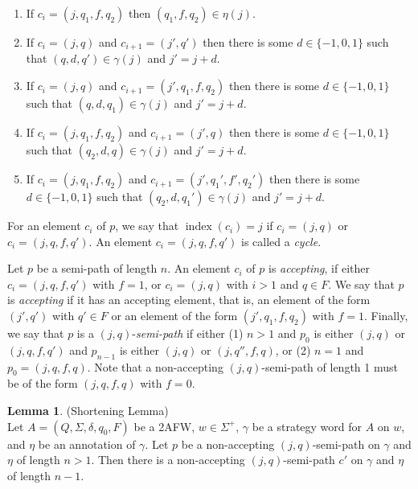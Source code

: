 \documentclass[10pt,a4paper]{amsart}
\theoremstyle{plain}
\theoremstyle{definition}
\newtheorem{lemma}[thm]{Lemma}
\theoremstyle{definition}
\DeclareMathOperator{\?}{?}
\DeclareMathOperator{\myindex}{index}
\begin{document}
\begin{enumerate}
    \item If $c_i = (j,q_1,f,q_2)$ then $(q_1,f,q_2) \in \eta(j)$.


    \item If $c_i = (j,q)$ and $c_{i+1} = (j',q')$ then there is some $d \in \{-1,0,1\}$ such that $(q,d,q') \in \gamma(j)$ and $j' = j + d$.


    \item If $c_i = (j,q)$ and $c_{i+1} = (j',q_1,f,q_2)$ then there is some $d \in \{-1,0,1\}$ such that $(q,d,q_1) \in \gamma(j)$ and $j' = j+d$.


    \item If $c_i = (j,q_1,f,q_2)$ and $c_{i+1} = (j',q)$ then there is some $d \in \{-1,0,1\}$ such that $(q_2,d,q) \in \gamma(j)$ and $j' = j + d$.


    \item If $c_i = (j,q_1,f,q_2)$ and $c_{i+1} = (j',q_1',f',q_2')$ then there is some $d \in \{-1,0,1\}$ such that $(q_2,d,q_1') \in \gamma(j)$ and $j' = j + d$.

\end{enumerate}
For an element $c_i$ of $p$, we say that $\myindex(c_i)=j$ if $c_i=(j,q)$ or $c_i=(j,q,f,q')$. An element $c_i=(j,q,f,q')$ is called a \emph{cycle}.

Let $p$ be a semi-path of length $n$. An element $c_i$ of $p$ is \emph{accepting}, if either $c_i=(j,q,f,q')$ with $f=1$, or $c_i=(j,q)$ with $i>1$ and $q\in F$.
We say that $p$ is \emph{accepting} if it has an accepting element, that is, an element of the form $(j',q')$ with $q' \in F$ or an element of the form $(j',q_1,f,q_2)$ with $f = 1$. Finally, we say that $p$ is a $(j,q)$-\textit{semi-path} if either (1) $n>1$ and $p_0$ is either $(j,q)$ or $(j,q,f,q')$ and $p_{n-1}$ is either $(j,q)$ or $(j,q'',f,q)$, or (2) $n=1$ and $p_0 = (j,q,f,q)$. Note that a non-accepting $(j,q)$-semi-path of length 1 must be of the form $(j,q,f,q)$ with $f=0$.

\begin{lemma} (Shortening Lemma)\\
Let $A = (Q,\Sigma,\delta,q_0,F)$ be a 2AFW, $w \in \Sigma^+$, $\gamma$ be a strategy word for $A$ on $w$, and $\eta$ be an annotation of $\gamma$. Let $p$ be a  non-accepting $(j,q)$-semi-path on $\gamma$ and $\eta$ of length $n>1$. Then there is a non-accepting $(j,q)$-semi-path $c'$ on $\gamma$ and $\eta$ of length $n-1$.
\end{lemma}
\end{document}
